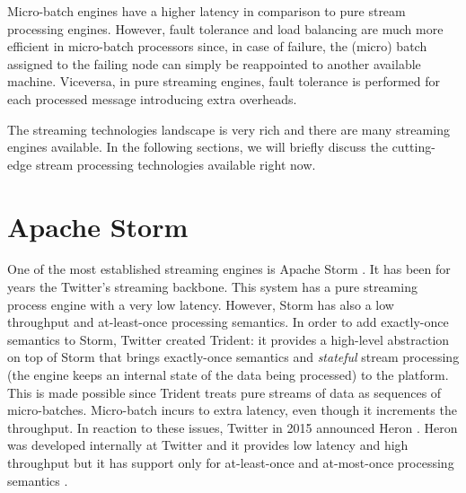 Micro-batch engines have a higher latency in comparison to pure stream processing engines. However, fault tolerance and load balancing are much more efficient in micro-batch processors since, in case of failure, the (micro) batch assigned to the failing node can simply be reappointed to another available machine. Viceversa, in pure streaming engines, fault tolerance is performed for each processed message introducing extra overheads.

The streaming technologies landscape is very rich and there are many streaming engines available. In the following sections, we will briefly discuss the cutting-edge stream processing technologies available right now.

\section{Apache Storm}
One of the most established streaming engines is Apache Storm \cite{apachestormonline}.%
It has been for years the Twitter's streaming backbone. This system has a pure streaming process engine with a very low latency. However, Storm has also a low throughput and at-least-once processing semantics. In order to add exactly-once semantics to Storm, Twitter created Trident: 
it provides a high-level abstraction on top of Storm that brings exactly-once semantics and \emph{stateful} stream processing (the engine keeps an internal state of the data being processed) to the platform. This is made possible since Trident treats pure streams of data as sequences of micro-batches. Micro-batch incurs to extra latency, even though it increments the throughput. In reaction to these issues, Twitter in 2015 announced Heron \cite{herononline}. Heron was developed internally at Twitter and it provides low latency and high throughput but it has support only for at-least-once and at-most-once processing semantics \cite{streaming@twitter, heron}. 
